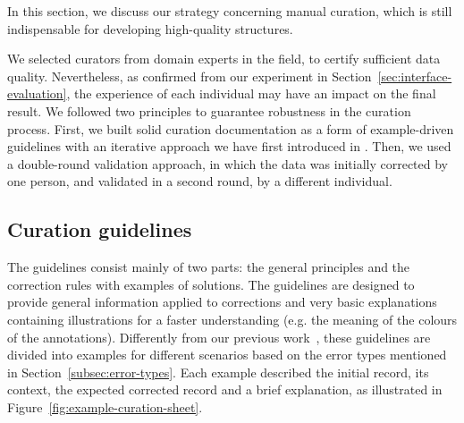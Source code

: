 \documentclass[]{interact}
\theoremstyle{plain} %
\theoremstyle{definition}
\theoremstyle{remark}
\begin{document}
In this section, we discuss our strategy concerning manual curation, which is still indispensable for developing high-quality structures. 

We selected curators from domain experts in the field, to certify sufficient data quality. 
Nevertheless, as confirmed from our experiment in Section~\ref{sec:interface-evaluation}, the experience of each individual may have an impact on the final result.
We followed two principles to guarantee robustness in the curation process. 
First, we built solid curation documentation as a form of example-driven guidelines with an iterative approach we have first introduced in \cite{foppiano2021supermat}. 
Then, we used a double-round validation approach, in which the data was initially corrected by one person, and validated in a second round, by a different individual. 



\subsection{Curation guidelines}

The guidelines consist mainly of two parts: the general principles and the correction rules with examples of solutions.
The guidelines are designed to provide general information applied to corrections and very basic explanations containing illustrations for a faster understanding (e.g. the meaning of the colours of the annotations). 
Differently from our previous work~\cite{foppiano2021supermat}, these guidelines are divided into examples for different scenarios based on the error types mentioned in Section~\ref{subsec:error-types}.
Each example described the initial record, its context, the expected corrected record and a brief explanation, as illustrated in Figure~\ref{fig:example-curation-sheet}. 
\end{document}
